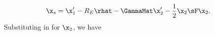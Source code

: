 \begin{equation}
\x_s = \x'_1 - R_E\rhat -  \GammaMat\x'_2 - \frac{1}{2}\x_2 \sF \x_2.
\end{equation}
Substituting in for $\x_2$, we have
  
  